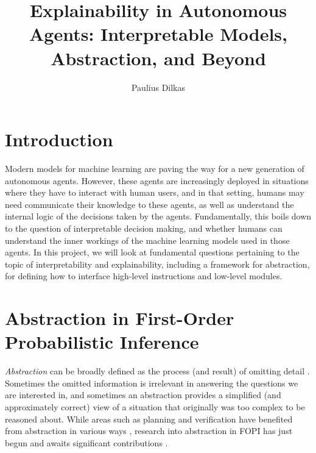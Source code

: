 \documentclass{article}
\begin{document}
\title{Explainability in Autonomous Agents: Interpretable Models, Abstraction,
  and Beyond}
\author{Paulius Dilkas}
\maketitle


\section{Introduction}

Modern models for machine learning are paving the way for a new generation of
autonomous agents. However, these agents are increasingly deployed in situations
where they have to interact with human users, and in that setting, humans may
need communicate their knowledge to these agents, as well as understand the
internal logic of the decisions taken by the agents. Fundamentally, this boils
down to the question of interpretable decision making, and whether humans can
understand the inner workings of the machine learning models used in those
agents. In this project, we will look at fundamental questions pertaining to the
topic of interpretability and explainability, including a framework for
abstraction, for defining how to interface high-level instructions and low-level
modules.

\section{Abstraction in First-Order Probabilistic Inference}

\emph{Abstraction} can be broadly defined as the process (and result) of
omitting detail \cite{doi:10.1086/670300}. Sometimes the omitted information is
irrelevant in answering the questions we are interested in, and sometimes an
abstraction provides a simplified (and approximately correct) view of a
situation that originally was too complex to be reasoned about. While areas such
as planning and verification have benefited from abstraction in various ways
\cite{saitta2013abstraction}, research into abstraction in FOPI has just begun
and awaits significant contributions
\cite{DBLP:journals/corr/abs-1810-02434,DBLP:conf/icml/HoltzenBM18,DBLP:conf/uai/HoltzenMB17}.
\end{document}
